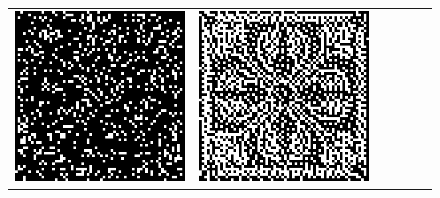 \begin{figure}
\begin{tabular}{c c c c c c}
		\includegraphics[width=\tilewidth,interpolate=false]{media/chp2/associative_memory/binam/01_01_noise_scaled_crushed.png}&%
		\includegraphics[width=\tilewidth,interpolate=false]{media/chp2/associative_memory/binam/01_02_out_scaled_crushed.png}\\

\end{tabular}
\end{figure}
